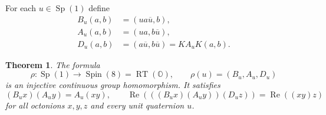 \documentclass[11pt]{article}
\newtheorem{theorem}{Theorem}[section]
\theoremstyle{definition}
\begin{document}
For each $u\in\operatorname{Sp}(1)$ define
\begin{equation}
 \begin{aligned}
 B_u(a,b)&=(u a\overline u,b),\\
 A_u(a,b)&=(u a,b\overline u),\\
 D_u(a,b)&=(a\overline u,b\overline u)=K A_u K(a,b).
 \end{aligned}
 \label{rettri:threeactions}
\end{equation}

\begin{theorem}
\label{rettri:subgroup}
The formula
\begin{equation}
 \rho:\operatorname{Sp}(1)\longrightarrow\operatorname{Spin}(8)
      =\operatorname{RT}(\mathbb O),\qquad
 \rho(u)=(B_u,A_u,D_u)
 \label{rettri:rho}
\end{equation}
is an injective continuous group homomorphism. It satisfies
\begin{equation}
 (B_u x)(A_u y)=A_u(xy),\qquad
 \operatorname{Re}(((B_u x)(A_u y))(D_u z))
           =\operatorname{Re}((xy)z)
 \label{rettri:product}
\end{equation}
for all octonions $x,y,z$ and every unit quaternion $u$.
\end{theorem}
\end{document}
